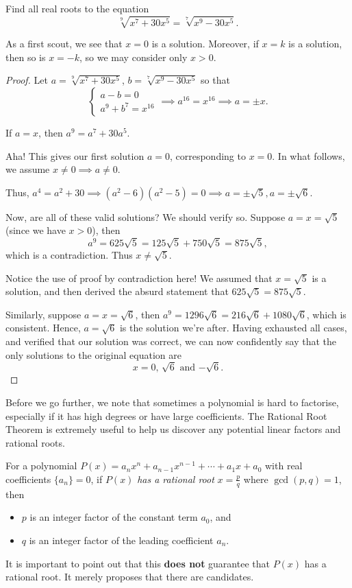 \documentclass[../jarvis.tex]{subfiles}
\begin{document}
\begin{example}[2021 SMO(O) P10]
Find all real roots to the equation
$$\sqrt[9]{x^7+30x^5}=\sqrt[7]{x^9-30x^5}.$$
\end{example}
As a first scout, we see that $x=0$ is a solution. Moreover, if $x=k$ is a solution, then so is $x=-k$, so we may consider only $x > 0$.
\begin{proof}
Let $a=\sqrt[9]{x^7+30x^5}$, $b=\sqrt[7]{x^9-30x^5}$ so that
$$\begin{cases}
    a-b=0 \\
    a^9+b^7=x^{16}
\end{cases}
\implies
a^{16}=x^{16} \implies a=\pm x.$$

If $a=x$, then $a^9=a^7+30a^5.$ 

Aha! This gives our first solution $a=0$, corresponding to $x=0$. In what follows, we assume $x\neq 0 \implies a\neq 0$.

Thus, $a^4=a^2+30 \implies (a^2-6)(a^2-5)=0 \implies a=\pm \sqrt{5}, a=\pm \sqrt{6}$.

Now, are all of these valid solutions? We should verify so. Suppose $a=x=\sqrt{5}$ (since we have $x>0$), then 
$$a^9=625\sqrt{5}=125\sqrt{5}+750\sqrt{5}=875\sqrt{5},$$ which is a contradiction. Thus $x\neq \sqrt{5}$.
\begin{remark}
Notice the use of proof by contradiction here! We assumed that $x=\sqrt{5}$ is a solution, and then derived the absurd statement that $625\sqrt{5}=875\sqrt{5}$.
\end{remark}
Similarly, suppose $a=x=\sqrt{6}$, then $a^9=1296\sqrt{6}=216\sqrt{6}+1080\sqrt{6}$, which is consistent. Hence, $a=\sqrt{6}$ is the solution we're after. Having exhausted all cases, and verified that our solution was correct, we can now confidently say that the only solutions to the original equation are $$\boxed{\text{$x=0$, $\sqrt{6}$ and $-\sqrt{6}$}}.$$
\end{proof}

Before we go further, we note that sometimes a polynomial is  hard to factorise, especially if it has high degrees or have large coefficients. The Rational Root Theorem is extremely useful to help us discover any potential linear factors and rational roots.
\begin{proposition}
For a polynomial $P(x)=a_nx^n+a_{n-1}x^{n-1}+\cdots+a_1x+a_0$ with real coefficients $\{a_n\}=0$, if $P(x)$ \textit{has a rational root} $x=\frac{p}{q}$ where $\gcd(p,q)=1$, then
\begin{itemize}
    \item $p$ is an integer factor of the constant term $a_0$, and
    \item $q$ is an integer factor of the leading coefficient $a_n$.
\end{itemize}
It is important to point out that this \textbf{does not} guarantee that $P(x)$ has a rational root. It merely proposes that there are candidates.
\end{proposition}
\end{document}
